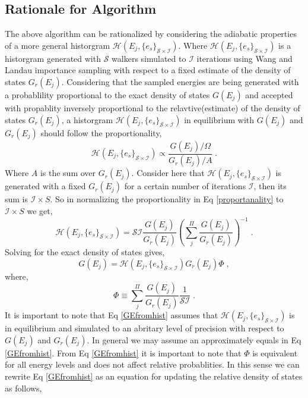\documentclass[aps,prl,reprint,superscriptaddress,showkeys]{revtex4-1}
\begin{document}
\subsection{Rationale for Algorithm}

The above algorithm can be rationalized by considering the adiabatic properties of a more general historgram $\mathcal{H}(E_j,\{e_s\}_{\mathcal{S}\times\mathcal{I}})$. Where  $\mathcal{H}(E_j,\{e_s\}_{\mathcal{S}\times\mathcal{I}})$ is a historgram generated with $\mathcal{S}$ walkers simulated to $\mathcal{I}$ iterations using Wang and Landau importance sampling with respect to  a fixed estimate of the density of states $G_r(E_j)$.  Considering that the sampled  energies are being generated with a probablility proportional to  the exact density of states $G(E_j)$ and accepted  with propablity inversely proportional to the relavtive(estimate) of the density of states $G_r(E_j)$, a historgram $\mathcal{H}(E_j,\{e_s\}_{\mathcal{S}\times\mathcal{I}})$ in equilibrium with $G(E_j)$ and $G_r(E_j)$ should follow the proportionality, 
\begin{equation}
\mathcal{H}(E_j,\{e_s\}_{\mathcal{S}\times\mathcal{I}}) \propto   \frac{G(E_j)/\Omega}{G_r(E_j)/A} \; .
\label{proportanality}
\end{equation}
Where $A$ is the sum over $G_r(E_j)$. Consider here that $\mathcal{H}(E_j,\{e_s\}_{\mathcal{S}\times\mathcal{I}})$ is generated with a fixed $G_r(E_j)$ for a certain number of iterations $\mathcal{I}$, then its sum is $\mathcal{I}\times S$.  So in normalizing the proportionality in Eq \ref{proportanality} to $\mathcal{I}\times S$ we get,
\begin{equation}
\mathcal{H}(E_j,\{e_s\}_{\mathcal{S}\times\mathcal{I}}) =  \mathcal{S I}\frac{G(E_j)}{G_r(E_j)}  (\sum_j^{\Pi}\frac{G(E_j)}{G_r(E_j)})^{-1} \;.
\label{dervied_GE_GEr_relationship}
\end{equation}
Solving for the exact density of states gives,
\begin{equation}
G(E_j) = \mathcal{H}(E_j,\{e_s\}_{\mathcal{S}\times\mathcal{I}}) G_r(E_j)  \Phi \;,
\label{GEfromhist}
\end{equation}
where,
\begin{equation}
  \Phi \equiv \sum_j^{\Pi}\frac{G(E_j)}{G_r(E_j)}\frac{1}{\mathcal{S I}} \;. 
 \end{equation}
 It is important to note that Eq \ref{GEfromhist} assumes that $\mathcal{H}(E_j,\{e_s\}_{\mathcal{S}\times\mathcal{I}})$ is in equilibrium and simulated to an abritary level of precision with respect to $G(E_j)$ and $G_r(E_j)$. In general we may assume an approximately equals in Eq \ref{GEfromhist}.  From Eq \ref{GEfromhist} it is important to note that $\Phi$ is equivalent for all energy levels and does not affect relative probablities.  In this sense we can rewrite  Eq \ref{GEfromhist} as an equation for updating the relative density of states as follows, 
\end{document}
